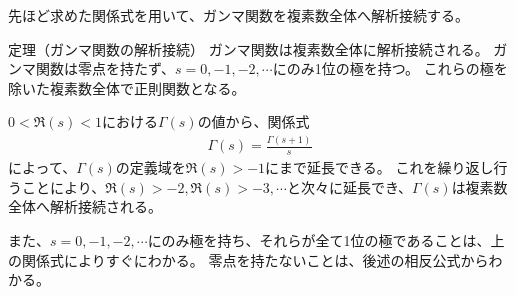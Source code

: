 \documentclass[11pt,b5paper,papersize,dvipdfmx]{jsbook}
\begin{document}
%
先ほど求めた関係式を用いて、ガンマ関数を複素数全体へ解析接続する。
\begin{thm}{定理（ガンマ関数の解析接続）}
  ガンマ関数は複素数全体に解析接続される。
  ガンマ関数は零点を持たず、$s=0,-1,-2,\cdots$にのみ1位の極を持つ。
  これらの極を除いた複素数全体で正則関数となる。
\end{thm}
\begin{prf}
  $0 < \Re(s) < 1$における$\Gamma(s)$の値から、関係式
  \begin{align*}
    \Gamma(s) = \frac{\Gamma(s+1)}{s}
  \end{align*}
  によって、$\Gamma(s)$の定義域を$\Re(s) > -1$にまで延長できる。
  これを繰り返し行うことにより、$\Re(s) > -2, \Re(s) > -3, \cdots$と次々に延長でき、$\Gamma(s)$は複素数全体へ解析接続される。\par
  また、$s=0,-1,-2,\cdots$にのみ極を持ち、それらが全て1位の極であることは、上の関係式によりすぐにわかる。
  零点を持たないことは、後述の相反公式からわかる。
\end{prf}
\end{document}
